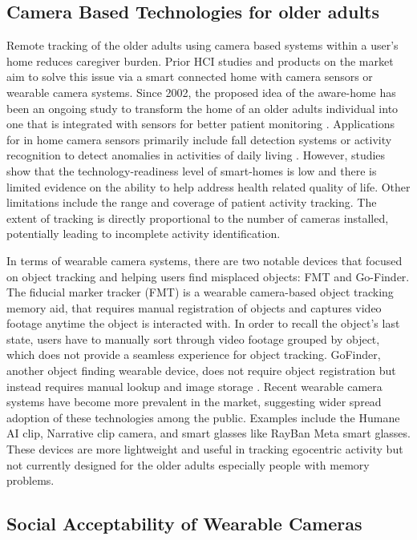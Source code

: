 \subsection{Camera Based Technologies for older adults }

Remote tracking of the older adults using camera based systems within a user's home reduces caregiver burden. Prior HCI studies and products on the market aim to solve this issue via a smart connected home with camera sensors or wearable camera systems. Since 2002, the proposed idea of the aware-home has been an ongoing study to transform the home of an older adults individual into one that is integrated with sensors for better patient monitoring \cite{abowd2002aware}. Applications for in home camera sensors primarily include fall detection systems \cite{de2017home} or activity recognition to detect anomalies in activities of daily living \cite{buzzelli2020vision}. However, studies show that the technology-readiness level of smart-homes is low \cite{liu2016smart} and there is limited evidence on the ability to help address health related quality of life. Other limitations include the range and coverage of patient activity tracking. The extent of tracking is directly proportional to the number of cameras installed, potentially leading to incomplete activity identification. 

In terms of wearable camera systems, there are two notable devices that focused on object tracking and helping users find misplaced objects: FMT and Go-Finder. The fiducial marker tracker (FMT) \cite{fmt} is a wearable camera-based object tracking memory aid, that requires manual registration of objects and captures video footage anytime the object is interacted with. In order to recall the object's last state, users have to manually sort through video footage grouped by object, which does not provide a seamless experience for object tracking. GoFinder, another object finding wearable device, does not require object registration but instead requires manual lookup and image storage \cite{gofinder}. Recent wearable camera systems have become more prevalent in the market, suggesting wider spread adoption of these technologies among the public. Examples include the Humane AI clip, Narrative clip camera, and smart glasses like RayBan Meta smart glasses. These devices are more lightweight and useful in tracking egocentric activity but not currently designed for the older adults especially people with memory problems.  

\subsection{Social Acceptability of Wearable Cameras}

